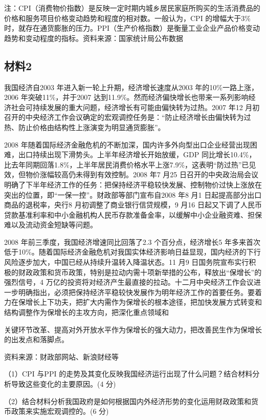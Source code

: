 \documentclass[UTF8,11pt]{ctexart}
\begin{document}
注：CPI（消费物价指数）是反映一定时期内城乡居民家庭所购买的生活消费品的价格和服务项目价格变动趋势和程度的相对数。一般认为，CPI 的增幅大于3\%时，就存在通货膨胀的压力。PPI（生产价格指数）是衡量工业企业产品价格变动趋势和变动程度的指标。资料来源：国家统计局公布数据


\subsection*{材料2}

我国经济自2003 年进入新一轮上升期，经济增长速度从2003 年的10\%一路上涨，2006 年突破11\%，并于2007 达到11.9\%。然而经济偏快增长也带来一系列影响经济社会可持续发展的重大问题，经济增长有可能由偏快转为过热。2007 年12 月初召开的中央经济工作会议确定的宏观调控任务是：“防止经济增长由偏快转为过热、防止价格由结构性上涨演变为明显通货膨胀”。

2008 年随着国际经济金融危机的不断加深，国内许多外向型出口企业经营出现困难，出口持续出现下滑势头。上半年经济增长开始放缓，GDP 同比增长10.4\%，比去年同期回落1.8\%，上半年居民消费价格水平上涨7.9\%，这表明“防过热”已见效，但物价涨幅较高仍未得到有效控制。2008 年7 月25 日召开的中央政治局会议明确了下半年经济工作的任务：把保持经济平稳较快发展、控制物价过快上涨放在突出的位置，即“一保一控”。财政部等部门宣布自2008 年8 月1 日起提高部分出口商品的退税率，央行8 月初调整了商业银行信贷规模，9 月16 日起又下调了人民币贷款基准利率和中小金融机构人民币存款准备金率，以缓解中小企业融资难、担保难以及流动资金短缺等问题。

2008 年前三季度，我国经济增速同比回落了2.3 个百分点，经济增长5 年多来首次低于10\%。随着国际经济金融危机对我国实体经济影响日益显现，国内经济的下行风险逐步加大，中国已经从持续升温转入降温状态。11 月9 日国务院宣布实行积极的财政政策和货币政策，特别是拉动内需十项新举措的公布，释放出“保增长”的强烈信号，4 万亿的投资将对经济产生最直接的拉动。十二月中央经济工作会议进一步明确指出，必须把保持经济平稳较快发展作为明年经济工作的首要任务。要着力在保增长上下功夫，把扩大内需作为保增长的根本途径，把加快发展方式转变和结构调整作为保增长的主攻方向，把深化重点领域和

关键环节改革、提高对外开放水平作为保增长的强大动力，把改善民生作为保增长的出发点和落脚点。

资料来源：财政部网站、新浪财经等

（1）CPI 与PPI 的走势及其变化反映我国经济运行出现了什么问题？结合材料分析导致这些变化的主要原因。(4 分)


（2）结合材料分析我国政府是如何根据国内外经济形势的变化运用财政政策和货币政策来实施宏观调控的。(6 分)
\end{document}
